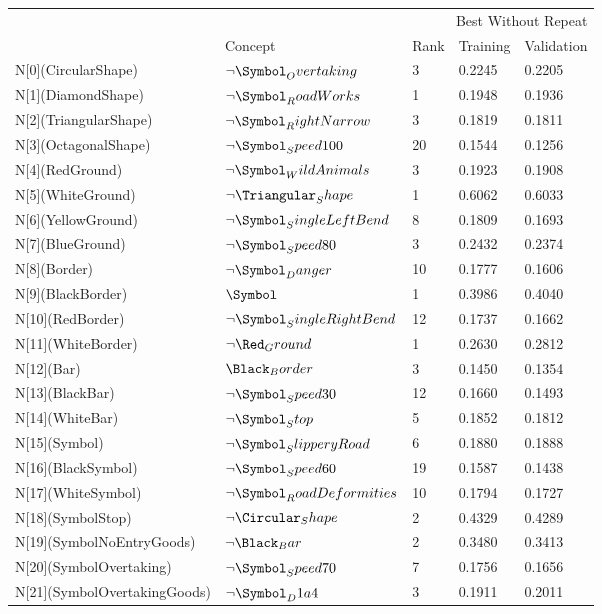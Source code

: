 \begin{tabular}{lllll}
\toprule
 & \multicolumn{4}{r}{Best Without Repeat} \\
 & Concept & Rank & Training & Validation \\
\midrule
N[0](CircularShape) & $\neg \Symbol_Overtaking$ & 3 & 0.2245 & 0.2205 \\
N[1](DiamondShape) & $\neg \Symbol_RoadWorks$ & 1 & 0.1948 & 0.1936 \\
N[2](TriangularShape) & $\neg \Symbol_RightNarrow$ & 3 & 0.1819 & 0.1811 \\
N[3](OctagonalShape) & $\neg \Symbol_Speed100$ & 20 & 0.1544 & 0.1256 \\
N[4](RedGround) & $\neg \Symbol_WildAnimals$ & 3 & 0.1923 & 0.1908 \\
N[5](WhiteGround) & $\neg \Triangular_Shape$ & 1 & 0.6062 & 0.6033 \\
N[6](YellowGround) & $\neg \Symbol_SingleLeftBend$ & 8 & 0.1809 & 0.1693 \\
N[7](BlueGround) & $\neg \Symbol_Speed80$ & 3 & 0.2432 & 0.2374 \\
N[8](Border) & $\neg \Symbol_Danger$ & 10 & 0.1777 & 0.1606 \\
N[9](BlackBorder) & $\Symbol$ & 1 & 0.3986 & 0.4040 \\
N[10](RedBorder) & $\neg \Symbol_SingleRightBend$ & 12 & 0.1737 & 0.1662 \\
N[11](WhiteBorder) & $\neg \Red_Ground$ & 1 & 0.2630 & 0.2812 \\
N[12](Bar) & $\Black_Border$ & 3 & 0.1450 & 0.1354 \\
N[13](BlackBar) & $\neg \Symbol_Speed30$ & 12 & 0.1660 & 0.1493 \\
N[14](WhiteBar) & $\neg \Symbol_Stop$ & 5 & 0.1852 & 0.1812 \\
N[15](Symbol) & $\neg \Symbol_SlipperyRoad$ & 6 & 0.1880 & 0.1888 \\
N[16](BlackSymbol) & $\neg \Symbol_Speed60$ & 19 & 0.1587 & 0.1438 \\
N[17](WhiteSymbol) & $\neg \Symbol_RoadDeformities$ & 10 & 0.1794 & 0.1727 \\
N[18](SymbolStop) & $\neg \Circular_Shape$ & 2 & 0.4329 & 0.4289 \\
N[19](SymbolNoEntryGoods) & $\neg \Black_Bar$ & 2 & 0.3480 & 0.3413 \\
N[20](SymbolOvertaking) & $\neg \Symbol_Speed70$ & 7 & 0.1756 & 0.1656 \\
N[21](SymbolOvertakingGoods) & $\neg \Symbol_D1a4$ & 3 & 0.1911 & 0.2011 \\

\end{tabular}
